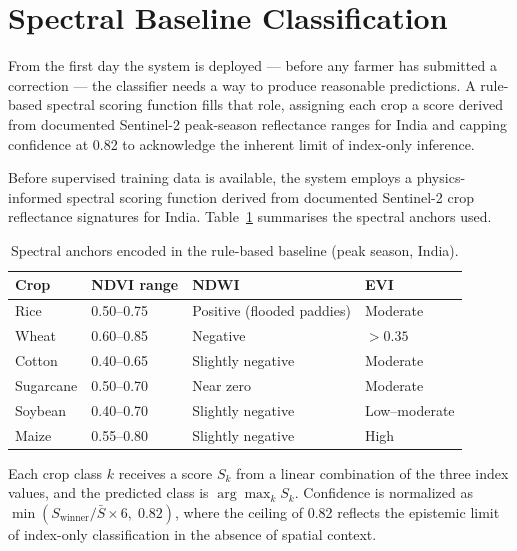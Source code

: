 \documentclass[12pt,a4paper,oneside]{report}
\begin{document}
\section{Spectral Baseline Classification}
\label{sec:spectral_baseline}

From the first day the system is deployed — before any farmer has submitted a correction — the classifier needs a way to produce reasonable predictions. A rule-based spectral scoring function fills that role, assigning each crop a score derived from documented Sentinel-2 peak-season reflectance ranges for India and capping confidence at 0.82 to acknowledge the inherent limit of index-only inference.

Before supervised training data is available, the system employs a physics-informed
spectral scoring function derived from documented Sentinel-2 crop reflectance
signatures for India. Table~\ref{tab:spectral_anchors} summarises the spectral
anchors used.

\begin{table}[h]
\centering
\caption{Spectral anchors encoded in the rule-based baseline (peak season, India).}
\label{tab:spectral_anchors}
\begin{tabular}{llll}
\toprule
\textbf{Crop} & \textbf{NDVI range} & \textbf{NDWI} & \textbf{EVI} \\
\midrule
Rice       & 0.50--0.75 & Positive (flooded paddies)        & Moderate \\
Wheat      & 0.60--0.85 & Negative                          & $>0.35$ \\
Cotton     & 0.40--0.65 & Slightly negative                 & Moderate \\
Sugarcane  & 0.50--0.70 & Near zero                         & Moderate \\
Soybean    & 0.40--0.70 & Slightly negative                 & Low--moderate \\
Maize      & 0.55--0.80 & Slightly negative                 & High \\
\bottomrule
\end{tabular}
\end{table}

Each crop class $k$ receives a score $S_k$ from a linear combination of the three
index values, and the predicted class is $\arg\max_k S_k$. Confidence is normalized
as $\min(S_\mathrm{winner} / \bar{S} \times 6,\; 0.82)$, where the ceiling of 0.82
reflects the epistemic limit of index-only classification in the absence of spatial
context.
\end{document}

